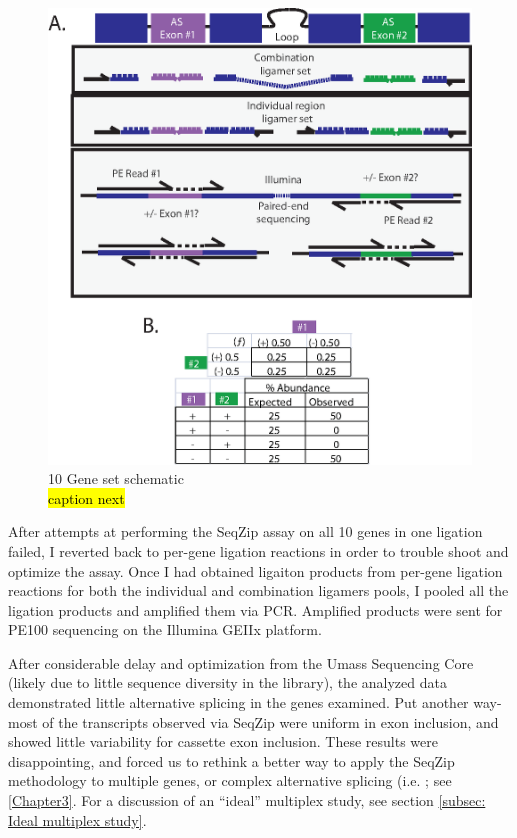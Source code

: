   \begin{figure}[htbp] %
    \centering 
    \includegraphics{Figures/SeqZipMethod/10GeneSetSchematic.eps}
    \caption[10 Gene Set schematic]
    {
      10 Gene set schematic\\
      \hl{caption next}
	    }
    \label{fig:Multiplex Study Design}
  	\end{figure}

  After attempts at performing the SeqZip assay on all 10 genes in one ligation failed, I reverted back to per-gene ligation reactions in order to trouble shoot and optimize the assay. Once I had obtained ligaiton products from per-gene ligation reactions for both the individual and combination ligamers pools, I pooled all the ligation products and amplified them via PCR. Amplified products were sent for PE100 sequencing on the Illumina GEIIx platform. 

  After considerable delay and optimization from the Umass Sequencing Core (likely due to little sequence diversity in the library), the analyzed data demonstrated little alternative splicing in the genes examined. Put another way- most of the transcripts observed via SeqZip were uniform in exon inclusion, and showed little variability for cassette exon inclusion. These results were disappointing, and forced us to rethink a better way to apply the SeqZip methodology to multiple genes, or complex alternative splicing (i.e. \dscam{}; see \ref{Chapter3}. For a discussion of an ``ideal'' multiplex study, see section \ref{subsec: Ideal multiplex study}.

